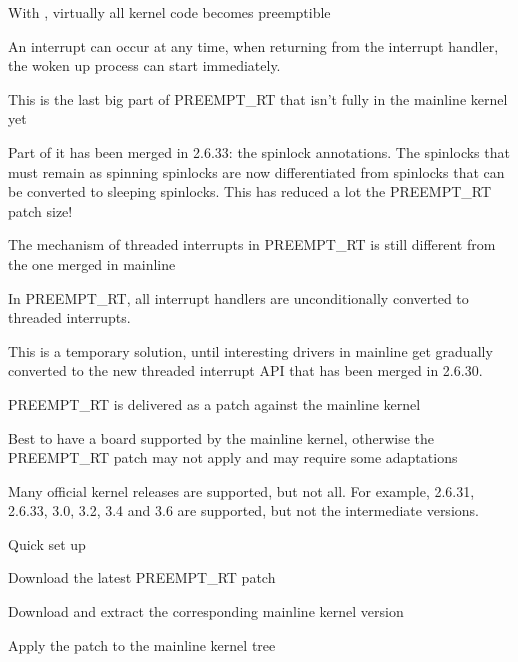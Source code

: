   \startitemize
  \item With , virtually all kernel code
    becomes preemptible
    \startitemize
    \item An interrupt can occur at any time, when returning from the
      interrupt handler, the woken up process can start immediately.
    \stopitemize
  \item This is the last big part of PREEMPT\_RT that isn't fully in
    the mainline kernel yet
    \startitemize
    \item Part of it has been merged in 2.6.33: the spinlock
      annotations. The spinlocks that must remain as spinning
      spinlocks are now differentiated from spinlocks that can be
      converted to sleeping spinlocks. This has reduced a lot the
      PREEMPT\_RT patch size!
    \stopitemize
  \stopitemize

  \startitemize
  \item The mechanism of threaded interrupts in PREEMPT\_RT is still
    different from the one merged in mainline
  \item In PREEMPT\_RT, all interrupt handlers are unconditionally
    converted to threaded interrupts.
  \item This is a temporary solution, until interesting drivers in
    mainline get gradually converted to the new threaded interrupt API
    that has been merged in 2.6.30.
  \stopitemize


  \startitemize
  \item PREEMPT\_RT is delivered as a patch against the mainline
    kernel
    \startitemize
    \item Best to have a board supported by the mainline kernel,
      otherwise the PREEMPT\_RT patch may not apply and may require
      some adaptations
    \stopitemize
  \item Many official kernel releases are supported, but not all. For
    example, 2.6.31, 2.6.33, 3.0, 3.2, 3.4 and 3.6 are supported, but
    not the intermediate versions.
  \item Quick set up
    \startitemize
    \item Download the latest PREEMPT\_RT patch\\
    \item Download and extract the corresponding mainline kernel
      version
    \item Apply the patch to the mainline kernel tree
    \stopitemize
  \stopitemize

